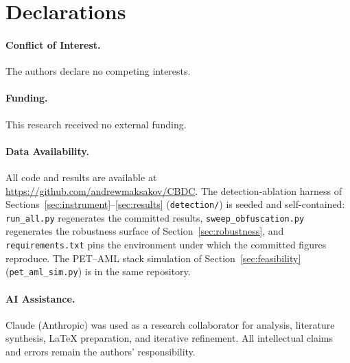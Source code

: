 \documentclass[11pt]{article}
\begin{document}
\section*{Declarations}

\paragraph{Conflict of Interest.} The authors declare no competing interests.

\paragraph{Funding.} This research received no external funding.

\paragraph{Data Availability.} All code and results are available at
\url{https://github.com/andrewmaksakov/CBDC}. The detection-ablation harness of
Sections~\ref{sec:instrument}--\ref{sec:results} (\texttt{detection/}) is seeded and self-contained:
\texttt{run\_all.py} regenerates the committed results, \texttt{sweep\_obfuscation.py} regenerates the
robustness surface of Section~\ref{sec:robustness}, and \texttt{requirements.txt} pins the environment
under which the committed figures reproduce. The PET--AML stack simulation of
Section~\ref{sec:feasibility} (\texttt{pet\_aml\_sim.py}) is in the same repository.

\paragraph{AI Assistance.} Claude (Anthropic) was used as a research collaborator for analysis,
literature synthesis, LaTeX preparation, and iterative refinement. All intellectual claims and errors
remain the authors' responsibility.

\clearpage


\end{document}
